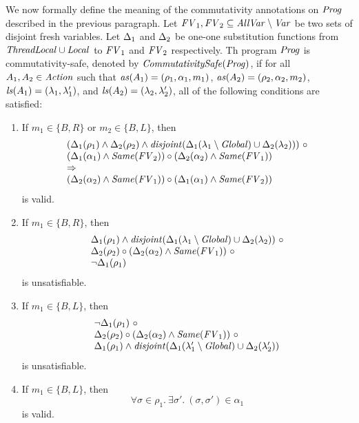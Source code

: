 We now formally define the meaning of the commutativity annotations on $\mathit{Prog}$ described in the previous paragraph.
Let $\mathit{FV}_1,\mathit{FV}_2 \subseteq \mathit{AllVar} \setminus \mathit{Var}$ be two sets of disjoint fresh variables.
Let $\Delta_1$ and $\Delta_2$ be one-one 
substitution functions from $\mathit{ThreadLocal} \cup \mathit{Local}$ to $\mathit{FV}_1$ and $\mathit{FV}_2$ respectively.
Th program $\mathit{Prog}$ is commutativity-safe, denoted by $\mathit{CommutativitySafe}(\mathit{Prog})$,
if for all $A_1,A_2 \in \mathit{Action}$ such that $\mathit{as}(A_1) = (\rho_1,\alpha_1,m_1)$, $\mathit{as}(A_2) = (\rho_2,\alpha_2,m_2)$,
$\mathit{ls}(A_1) = (\lambda_1,\lambda'_1)$, and $\mathit{ls}(A_2) = (\lambda_2,\lambda'_2)$, 
all of the following conditions are satisfied:
\begin{enumerate}
\item
If $m_1 \in \{B,R\}$ or $m_2 \in \{B,L\}$, then 
\[
\begin{array}{l}
(\Subst_1(\rho_1) \wedge \Subst_2(\rho_2) \wedge \disjoint(\Subst_1(\lins_1 \setminus \Global) \cup \Subst_2(\lins_2)))\ \circ \\
(\Subst_1(\alpha_1) \wedge \Same(\FV_2)) \circ (\Subst_2(\alpha_2) \wedge \Same(\FV_1)) \\ 
\Rightarrow \\
(\Subst_2(\alpha_2) \wedge \Same(\FV_1)) \circ (\Subst_1(\alpha_1) \wedge \Same(\FV_2))
\end{array}
\]
is valid.
\item
If $m_1 \in \{B,R\}$, then 
\[
\begin{array}{l}
\Delta_1(\rho_1) \wedge \mathit{disjoint}(\Delta_1(\lambda_1 \setminus \mathit{Global}) \cup \Delta_2(\lambda_2))\ \circ \\
\Delta_2(\rho_2) \circ (\Delta_2(\alpha_2) \wedge \mathit{Same}(\mathit{FV}_1))\ \circ \\
\neg \Delta_1(\rho_1)
\end{array}
\]
is unsatisfiable.
\item
If $m_1 \in \{B,L\}$, then 
\[
\begin{array}{l}
\neg \Delta_1(\rho_1)\ \circ \\
\Delta_2(\rho_2) \circ (\Delta_2(\alpha_2) \wedge \mathit{Same}(\mathit{FV}_1))\ \circ \\
\Delta_1(\rho_1) \wedge \mathit{disjoint}(\Delta_1(\lambda'_1 \setminus \mathit{Global}) \cup \Delta_2(\lambda'_2))
\end{array}
\]
is unsatisfiable.
\item
If $m_1 \in \{B, L\}$, then
\[
\forall \sigma \in \rho_1.\ \exists \sigma'.\ (\sigma, \sigma') \in \alpha_1
\]
is valid.
\end{enumerate}

